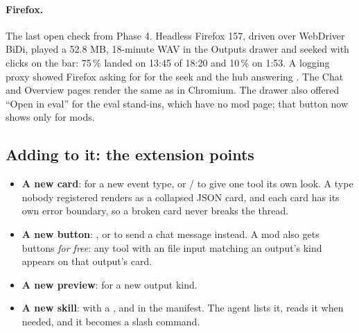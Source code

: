 \begin{center}
\hfill
{}
\end{center}

\paragraph{Firefox.} The last open check from Phase 4. Headless Firefox 157, driven over WebDriver BiDi, played a 52.8 MB, 18-minute WAV in the Outputs drawer and seeked with clicks on the bar: 75\,\% landed on 13:45 of 18:20 and 10\,\% on 1:53. A logging proxy showed Firefox asking for  for the seek and the hub answering . The Chat and Overview pages render the same as in Chromium. The drawer also offered ``Open in eval'' for the eval stand-ins, which have no mod page; that button now shows only for mods.

\begin{center}
\end{center}

\subsection*{Adding to it: the extension points}
\begin{itemize}[leftmargin=*]
\item \textbf{A new card}:  for a new event type, or  /  to give one tool its own look. A type nobody registered renders as a collapsed JSON card, and each card has its own error boundary, so a broken card never breaks the thread.
\item \textbf{A new button}: , or  to send a chat message instead. A mod also gets buttons \emph{for free}: any tool with an  file input matching an output's kind appears on that output's card.
\item \textbf{A new preview}:  for a new output kind.
\item \textbf{A new skill}:  with a , and  in the manifest. The agent lists it, reads it when needed, and it becomes a  slash command.
\end{itemize}
